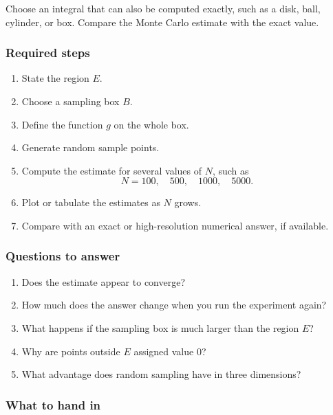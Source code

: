 Choose an integral that can also be computed exactly, such as a disk, ball, cylinder, or
box.  Compare the Monte Carlo estimate with the exact value.

\subsubsection*{Required steps}

\begin{enumerate}
\item State the region \(E\).

\item Choose a sampling box \(B\).

\item Define the function \(g\) on the whole box.

\item Generate random sample points.

\item Compute the estimate for several values of \(N\), such as
\[
    N=100,\quad 500,\quad 1000,\quad 5000.
\]

\item Plot or tabulate the estimates as \(N\) grows.

\item Compare with an exact or high-resolution numerical answer, if available.
\end{enumerate}

\subsubsection*{Questions to answer}

\begin{enumerate}
\item Does the estimate appear to converge?

\item How much does the answer change when you run the experiment again?

\item What happens if the sampling box is much larger than the region \(E\)?

\item Why are points outside \(E\) assigned value \(0\)?

\item What advantage does random sampling have in three dimensions?
\end{enumerate}

\subsubsection*{What to hand in}

